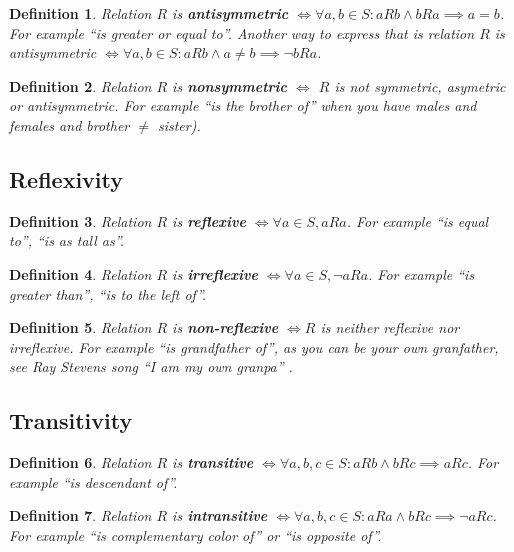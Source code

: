\documentclass[11pt]{article}
\theoremstyle{plain}
\newtheorem{defn}{Definition}
\theoremstyle{definition}
\begin{document}
\begin{defn}
  Relation $R$ is \textbf{antisymmetric} $\iff \forall a, b \in S: aRb \land bRa \implies a = b$.
  For example ``is greater or equal to''.
  Another way to express that is relation $R$ is antisymmetric $\iff \forall a, b \in S: aRb \land a \neq b \implies \neg bRa$.
\end{defn}

\begin{defn}
  Relation $R$ is \textbf{nonsymmetric} $\iff$ $R$ is not symmetric, asymetric or antisymmetric.
  For example ``is the brother of'' when you have males and females and brother $\neq$ sister).
\end{defn}

\subsection{Reflexivity}

\begin{defn}
  Relation $R$ is \textbf{reflexive} $\iff \forall a \in S, aRa$.
  For example ``is equal to'', ``is as tall as''.
\end{defn}

\begin{defn}
  Relation $R$ is \textbf{irreflexive} $\iff \forall a \in S, \neg aRa$.
  For example ``is greater than'', ``is to the left of''.
\end{defn}

\begin{defn}
  Relation $R$ is \textbf{non-reflexive} $\iff R$ is neither reflexive nor irreflexive.
  For example ``is grandfather of'', as you can be your own granfather,
  see Ray Stevens song ``I am my own granpa'' \smiley.
\end{defn}

\subsection{Transitivity}

\begin{defn}
  Relation $R$ is \textbf{transitive} $\iff \forall a, b, c \in S: aRb \land bRc \implies aRc$.
  For example ``is descendant of''.
\end{defn}

\begin{defn}
  Relation $R$ is \textbf{intransitive} $\iff \forall a, b, c \in S: aRa \land bRc \implies \neg aRc$.
  For example ``is complementary color of'' or ``is opposite of''.
\end{defn}
\end{document}
